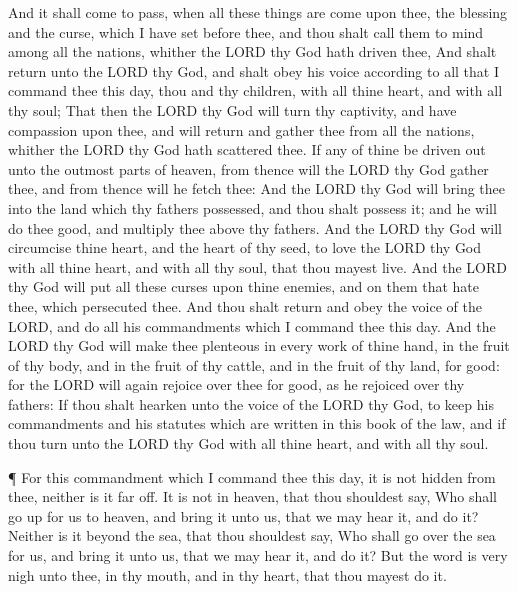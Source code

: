  And it shall come to pass, when all these things are come
upon thee, the blessing and the curse, which I have set before thee, and
thou shalt call them to mind among all the nations, whither the LORD thy
God hath driven thee,  And shalt return unto the LORD thy
God, and shalt obey his voice according to all that I command thee this
day, thou and thy children, with all thine heart, and with all thy soul;
 That then the LORD thy God will turn thy captivity, and
have compassion upon thee, and will return and gather thee from all the
nations, whither the LORD thy God hath scattered thee.  If
any of thine be driven out unto the outmost parts of heaven, from thence
will the LORD thy God gather thee, and from thence will he fetch thee:
 And the LORD thy God will bring thee into the land which
thy fathers possessed, and thou shalt possess it; and he will do thee
good, and multiply thee above thy fathers.  And the LORD thy
God will circumcise thine heart, and the heart of thy seed, to love the
LORD thy God with all thine heart, and with all thy soul, that thou
mayest live.  And the LORD thy God will put all these curses
upon thine enemies, and on them that hate thee, which persecuted thee.
 And thou shalt return and obey the voice of the LORD, and
do all his commandments which I command thee this day.  And
the LORD thy God will make thee plenteous in every work of thine hand,
in the fruit of thy body, and in the fruit of thy cattle, and in the
fruit of thy land, for good: for the LORD will again rejoice over thee
for good, as he rejoiced over thy fathers:  If thou shalt
hearken unto the voice of the LORD thy God, to keep his commandments and
his statutes which are written in this book of the law, and if thou turn
unto the LORD thy God with all thine heart, and with all thy soul.

 ¶ For this commandment which I command thee this day, it
is not hidden from thee, neither is it far off.  It is not
in heaven, that thou shouldest say, Who shall go up for us to heaven,
and bring it unto us, that we may hear it, and do it? 
Neither is it beyond the sea, that thou shouldest say, Who shall go over
the sea for us, and bring it unto us, that we may hear it, and do it?
 But the word is very nigh unto thee, in thy mouth, and in
thy heart, that thou mayest do it.


